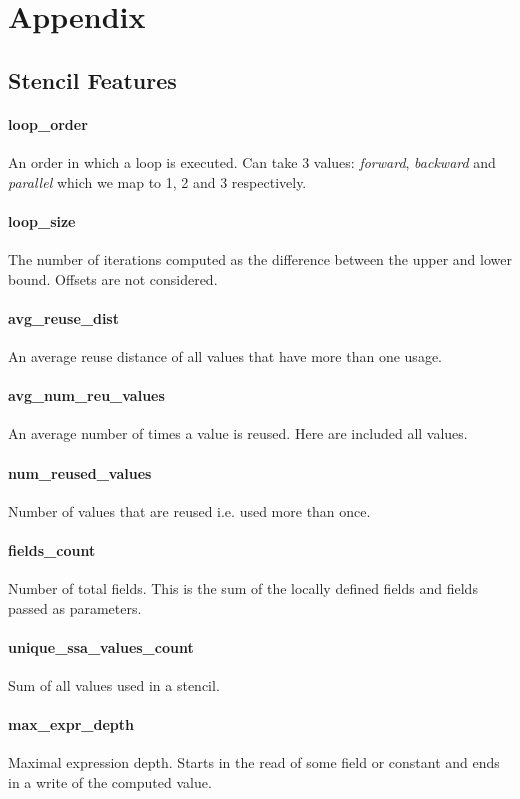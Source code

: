 \documentclass[sigplan,\review anonymous]{acmart}
\begin{document}
%


\appendix
\section{Appendix}

\subsection{Stencil Features}

\paragraph{loop\_order} An order in which a loop is executed. Can take 3
  values: \textit{forward}, \textit{backward} and \textit{parallel} which we
  map to 1, 2 and 3 respectively.
\paragraph{loop\_size} The number of iterations computed as the difference
  between the upper and lower bound. Offsets are not considered.
\paragraph{avg\_reuse\_dist} An average reuse distance of all values that
  have more than one usage.
\paragraph{avg\_num\_reu\_values} An average number of times a value is
  reused. Here are included all values.
\paragraph{num\_reused\_values} Number of values that are reused i.e. used
  more than once.
\paragraph{fields\_count} Number of total fields. This is the sum of the
  locally defined fields and fields passed as parameters.
\paragraph{unique\_ssa\_values\_count} Sum of all values used in a stencil.
\paragraph{max\_expr\_depth} Maximal expression depth. Starts in the read
  of some field or constant and ends in a write of the computed value.
\end{document}
